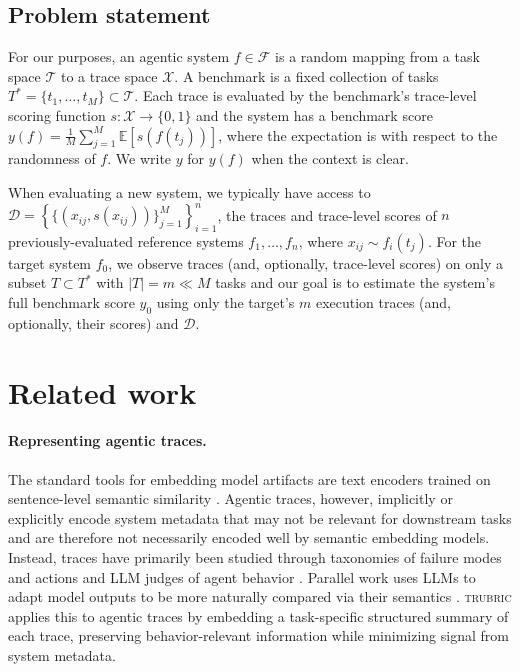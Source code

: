 \documentclass{article}
\newcommand{\trubric}{\textsc{trubric}}
\begin{document}
\subsection{Problem statement}
\label{sec:problem}

For our purposes, an agentic system $f \in \mathcal{F}$ is a random mapping from a task space $\mathcal{T}$ to a trace space $\mathcal{X}$.
A benchmark is a fixed collection of tasks $T^{*} = \{t_{1}, \hdots, t_{M}\} \subset \mathcal{T}$.
Each trace is evaluated by the benchmark's trace-level scoring function $s: \mathcal{X} \to \{0, 1\}$ and the system has a benchmark score $ y(f) = \frac{1}{M} \sum_{j=1}^{M} \mathbb{E}\left[ s(f(t_{j})) \right] $,
where the expectation is with respect to the randomness of $f$.
We write $y$ for $y(f)$ when the context is clear.

When evaluating a new system, we typically have access to $ \mathcal{D} = \left\{ \{ (x_{ij}, s(x_{ij})) \}_{j=1}^{M} \right\}_{i=1}^{n} $, the traces and trace-level scores of $n$ previously-evaluated reference systems $f_{1}, \hdots, f_{n}$,
where $x_{ij} \sim f_{i}(t_{j})$.
For the target system $f_{0}$, we observe traces (and, optionally, trace-level scores) on only a subset $T \subset T^{*}$ with $|T| = m \ll M$ tasks and our goal is to estimate the system's full benchmark score $ y_{0} $ using only the target's $m$ execution traces (and, optionally, their scores) and $\mathcal{D}$.

\section{Related work}
\label{sec:related}

\paragraph{Representing agentic traces.}
The standard tools for embedding model artifacts are text encoders trained on sentence-level semantic similarity \citep{reimers2019sbert, su2023instructor, nussbaum2025trainingsparsemixtureexperts}.
Agentic traces, however, implicitly or explicitly encode system metadata that may not be relevant for downstream tasks \citep{sun2025idiosyncrasies, oderinwale2026trajectories} and are therefore not necessarily encoded well by semantic embedding models.
Instead, traces have primarily been studied through taxonomies of failure modes and actions \citep{cemri2025mast, shu2026traceprobe} and LLM judges of agent behavior \citep{zhuge2025agentjudge, mehtiyev2026beyond}.
Parallel work uses LLMs to adapt model outputs to be more naturally compared via their semantics \citep{ravfogel2024description, peng2024inbedder, benara2024qaemb}.
\trubric{} applies this to agentic traces by embedding a task-specific structured summary of each trace, preserving behavior-relevant information while minimizing signal from system metadata.
\end{document}
